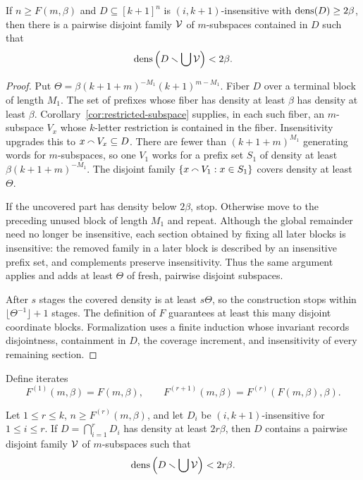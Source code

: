 \begin{lemma}
\label{lem:tile-insensitive}
If $n\geq F(m,\beta)$ and $D\subseteq[k+1]^n$ is $(i,k+1)$-insensitive with
$\operatorname{dens}(D)\geq2\beta$, then there is a pairwise disjoint family $\mathcal{V}$ of $m$-subspaces contained
in $D$ such that
\[
  \operatorname{dens}\left(D\smallsetminus\bigcup\mathcal{V}\right)<2\beta.
\]
\end{lemma}

\begin{proof}
Put
$\Theta=\beta(k+1+m)^{-M_1}(k+1)^{m-M_1}$.  Fiber $D$ over a terminal block of length $M_1$.
The set of prefixes whose fiber has density at least $\beta$ has density at least $\beta$.
Corollary~\ref{cor:restricted-subspace} supplies, in each such fiber, an $m$-subspace $V_x$ whose
$k$-letter restriction is contained in the fiber.  Insensitivity upgrades this to
$x\mathbin{\smallfrown} V_x\subseteq D$.  There are fewer than $(k+1+m)^{M_1}$ generating words for
$m$-subspaces, so one $V_1$ works for a prefix set $S_1$ of density at least
$\beta(k+1+m)^{-M_1}$.  The disjoint family
$\{x\mathbin{\smallfrown} V_1:x\in S_1\}$ covers density at least $\Theta$.

If the uncovered part has density below $2\beta$, stop.  Otherwise move to the preceding unused
block of length $M_1$ and repeat.  Although the global remainder need no longer be insensitive,
each section obtained by fixing all later blocks is insensitive: the removed family in a later
block is described by an insensitive prefix set, and complements preserve insensitivity.  Thus the
same argument applies and adds at least $\Theta$ of fresh, pairwise disjoint subspaces.

After $s$ stages the covered density is at least $s\Theta$, so the construction stops within
$\lfloor\Theta^{-1}\rfloor+1$ stages.  The definition of $F$ guarantees at least this many disjoint
coordinate blocks.  Formalization uses a finite induction whose invariant records disjointness,
containment in $D$, the coverage increment, and insensitivity of every remaining section.
\end{proof}

Define iterates
\[
 F^{(1)}(m,\beta)=F(m,\beta),\qquad
 F^{(r+1)}(m,\beta)=F^{(r)}(F(m,\beta),\beta).
\]

\begin{corollary}
\label{cor:tile-intersection}
Let $1\leq r\leq k$, $n\geq F^{(r)}(m,\beta)$, and let $D_i$ be
$(i,k+1)$-insensitive for $1\leq i\leq r$.  If $D=\bigcap_{i=1}^rD_i$ has density at least
$2r\beta$, then $D$ contains a pairwise disjoint family $\mathcal{V}$ of $m$-subspaces such that
\[
 \operatorname{dens}\left(D\smallsetminus\bigcup\mathcal{V}\right)<2r\beta.
\]
\end{corollary}

